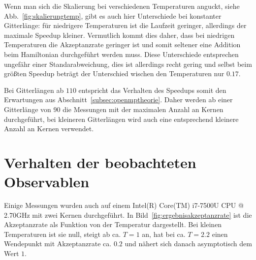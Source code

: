 	Wenn man sich die Skalierung bei verschiedenen Temperaturen anguckt, siehe Abb.~\ref{fig:skalierungtemp}, gibt es auch hier Unterschiede bei konstanter Gitterlänge: für niedrigere Temperaturen ist die Laufzeit geringer, allerdings der maximale Speedup kleiner. Vermutlich kommt dies daher, dass bei niedrigen Temperaturen die Akzeptanzrate geringer ist und somit seltener eine Addition beim Hamiltonian durchgeführt werden muss. Diese Unterschiede entsprechen ungefähr einer Standarabweichung, dies ist allerdings recht gering und selbst beim größten Speedup beträgt der Unterschied wischen den Temperaturen nur $\num{0,17}$.
	
	Bei Gitterlängen ab $110$ entspricht das Verhalten des Speedups somit den Erwartungen aus Abschnitt~\ref{subsec:openmptheorie}. Daher werden ab einer Gitterlänge von 90 die Messungen mit der maximalen Anzahl an Kernen durchgeführt, bei kleineren Gitterlängen wird auch eine entsprechend kleinere Anzahl an Kernen verwendet. 
	
	
	
	
	\section{Verhalten der beobachteten Observablen}
	\label{sec:ergebnisobservablen}
	
	Einige Messungen wurden auch auf einem Intel(R) Core(TM) i7-7500U CPU @ 2.70GHz mit zwei Kernen durchgeführt. 
	In Bild~\ref{fig:ergebnisakzeptanzrate} ist die Akzeptanzrate als Funktion von der Temperatur dargestellt. Bei kleinen Temperaturen ist sie null, steigt ab ca. $T=1$ an, hat bei ca. $T=\num{2,2}$ einen Wendepunkt mit Akzeptanzrate ca. $\num{0,2}$ und nähert sich danach asymptotisch dem Wert $1$. 
	
	

